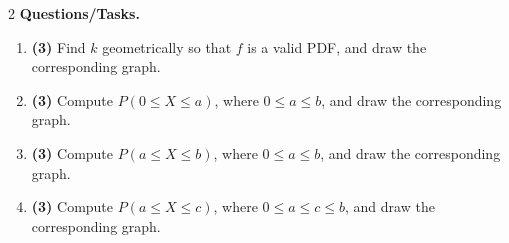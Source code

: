 \begin{multicols}{2}
		\textbf{Questions/Tasks.}
		\begin{enumerate}[label=(\alph*)]
			\item \textbf{(3)} Find $k$ geometrically so that $f$ is a valid PDF, and draw the corresponding graph.
			\item \textbf{(3)} Compute $P(0\le X\le a)$, where $0\le a\le b$, and draw the corresponding graph.
			\item \textbf{(3)} Compute $P(a\le X\le b)$, where $0\le a\le b$, and draw the corresponding graph.
			\item \textbf{(3)} Compute $P(a\le X\le c)$, where $0\le a\le c\le b$, and draw the corresponding graph.
		\end{enumerate}
		
	\end{multicols}
	
